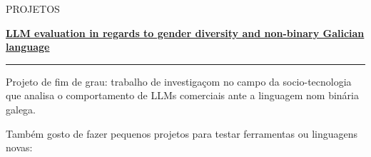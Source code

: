 \documentclass [a4paper] {extarticle} %
\newcommand{\sectionlinethickness} {0.5pt}
\newcommand{\leftcolumwidth} {0.15}
\newcommand{\rightcolumwidth}{0.84}
\newcommand {\sectiontitle}[1] {
  \vspace*{-10pt}
  \begin {flushleft}
  \begin {minipage}[c]{\leftcolumwidth\textwidth}
    \begin {flushright}
      \!\MakeUppercase {#1}
      \hspace* {10pt}
    \end {flushright}
  \end {minipage}
  \begin{minipage}[c]{\rightcolumwidth\textwidth}
    \begin {tikzpicture}[remember picture, overlay,blend mode=multiply]
      \draw [line width=\sectionlinethickness, black] (0,0) -- (15,0);
    \end {tikzpicture}
  \end{minipage}
  \end {flushleft}
}
\begin{document}

\sectiontitle {projetos}
\vspace{-15pt}

\begin {flushright}
\begin {minipage} [t] {\rightcolumwidth\textwidth}

  \href {https://github.com/yref-boop/ai-bias} {\textbf {LLM evaluation in regards to gender diversity and non-binary Galician language}}
  \hfill
  \vspace{1pt}
  \hrule
  \vspace {4pt} Projeto de fim de grau: trabalho de investigaçom no campo da socio-tecnologia que analisa o comportamento de LLMs comerciais ante a linguagem nom binária galega.
  \vspace{5pt}

  Também gosto de fazer pequenos projetos para testar ferramentas ou linguagens novas:
  \vspace{5pt}


\end{minipage}
\end{flushright}
\end{document}
